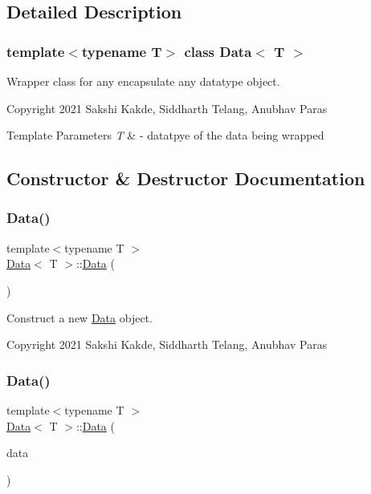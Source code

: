 \subsection{Detailed Description}
\subsubsection*{template$<$typename T$>$\newline
class Data$<$ T $>$}

Wrapper class for any encapsulate any datatype object. 

Copyright 2021 Sakshi Kakde, Siddharth Telang, Anubhav Paras 
\begin{DoxyTemplParams}{Template Parameters}
{\em T} & -\/ datatpye of the data being wrapped \\
\hline
\end{DoxyTemplParams}


\subsection{Constructor \& Destructor Documentation}
\mbox{\label{classData_ab37beb31b788e0c806211af241b86bba}} 
\subsubsection{\texorpdfstring{Data()}{Data()}\hspace{0.1cm}{\footnotesize\ttfamily [1/2]}}
{\footnotesize\ttfamily template$<$typename T $>$ \\
\hyperlink{classData}{Data}$<$ T $>$\+::\hyperlink{classData}{Data} (\begin{DoxyParamCaption}{ }\end{DoxyParamCaption})}



Construct a new \hyperlink{classData}{Data} object. 

Copyright 2021 Sakshi Kakde, Siddharth Telang, Anubhav Paras \mbox{\label{classData_aeaaa183d93a880175aa4775525cd6165}} 
\subsubsection{\texorpdfstring{Data()}{Data()}\hspace{0.1cm}{\footnotesize\ttfamily [2/2]}}
{\footnotesize\ttfamily template$<$typename T $>$ \\
\hyperlink{classData}{Data}$<$ T $>$\+::\hyperlink{classData}{Data} (\begin{DoxyParamCaption}\item[{T}]{data }\end{DoxyParamCaption})\hspace{0.3cm}{\ttfamily [explicit]}}




